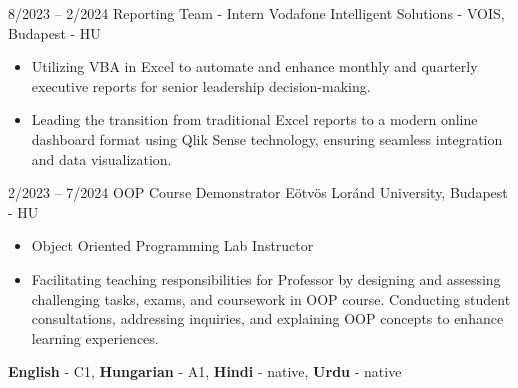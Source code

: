 \documentclass[9pt]{developercv} %
\begin{document}
\vspace{-10 pt}
\begin{entrylist}
	\entry
        {8/2023 -- 2/2024}
		{Reporting Team - Intern}
		{Vodafone Intelligent Solutions - VOIS, Budapest - HU}
		{\vspace{-10pt}
        \begin{itemize}[noitemsep,topsep=0pt,parsep=0pt,partopsep=0pt, leftmargin=-1pt]
            \item Utilizing VBA in Excel to automate and enhance monthly and quarterly executive reports for senior leadership decision-making.
            \item Leading the transition from traditional Excel reports to a modern online dashboard format using Qlik Sense technology, ensuring seamless integration and data visualization.
        \end{itemize} 
        }
	\entry
        {2/2023 -- 7/2024}
		{OOP Course Demonstrator}
		{Eötvös Loránd University, Budapest - HU}
		{\vspace{-10pt}
        \begin{itemize}[noitemsep,topsep=0pt,parsep=0pt,partopsep=0pt, leftmargin=-1pt]
            \item Object Oriented Programming Lab Instructor
            \item Facilitating teaching responsibilities for Professor by designing and assessing challenging tasks, exams, and coursework in OOP course. Conducting student consultations, addressing inquiries, and explaining OOP concepts to enhance learning experiences.
        \end{itemize} 
        }
	
\end{entrylist}

\vspace{-10 pt}
    \vspace{-6pt}
    
    \hspace{26mm} \textbf{English} - C1, \textbf{ Hungarian} - A1, \textbf{ Hindi} - native, \textbf{ Urdu} - native
\end{document}

